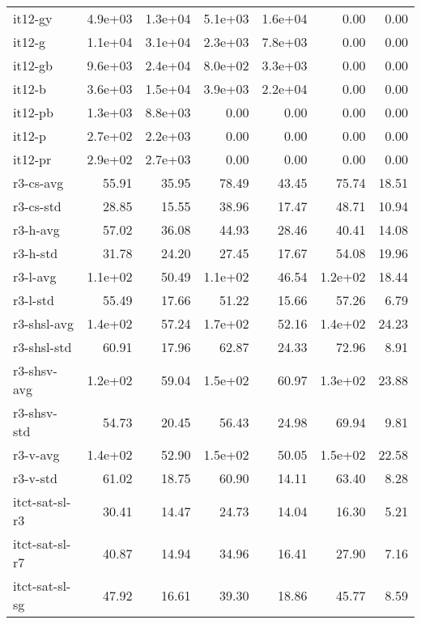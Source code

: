 \begin{tabular}{lrrrrrr}
it12-gy             & 4.9e+03 & 1.3e+04 & 5.1e+03 & 1.6e+04 &    0.00 &    0.00 \\
it12-g              & 1.1e+04 & 3.1e+04 & 2.3e+03 & 7.8e+03 &    0.00 &    0.00 \\
it12-gb             & 9.6e+03 & 2.4e+04 & 8.0e+02 & 3.3e+03 &    0.00 &    0.00 \\
it12-b              & 3.6e+03 & 1.5e+04 & 3.9e+03 & 2.2e+04 &    0.00 &    0.00 \\
it12-pb             & 1.3e+03 & 8.8e+03 &    0.00 &    0.00 &    0.00 &    0.00 \\
it12-p              & 2.7e+02 & 2.2e+03 &    0.00 &    0.00 &    0.00 &    0.00 \\
it12-pr             & 2.9e+02 & 2.7e+03 &    0.00 &    0.00 &    0.00 &    0.00 \\
r3-cs-avg           &   55.91 &   35.95 &   78.49 &   43.45 &   75.74 &   18.51 \\
r3-cs-std           &   28.85 &   15.55 &   38.96 &   17.47 &   48.71 &   10.94 \\
r3-h-avg            &   57.02 &   36.08 &   44.93 &   28.46 &   40.41 &   14.08 \\
r3-h-std            &   31.78 &   24.20 &   27.45 &   17.67 &   54.08 &   19.96 \\
r3-l-avg            & 1.1e+02 &   50.49 & 1.1e+02 &   46.54 & 1.2e+02 &   18.44 \\
r3-l-std            &   55.49 &   17.66 &   51.22 &   15.66 &   57.26 &    6.79 \\
r3-shsl-avg         & 1.4e+02 &   57.24 & 1.7e+02 &   52.16 & 1.4e+02 &   24.23 \\
r3-shsl-std         &   60.91 &   17.96 &   62.87 &   24.33 &   72.96 &    8.91 \\
r3-shsv-avg         & 1.2e+02 &   59.04 & 1.5e+02 &   60.97 & 1.3e+02 &   23.88 \\
r3-shsv-std         &   54.73 &   20.45 &   56.43 &   24.98 &   69.94 &    9.81 \\
r3-v-avg            & 1.4e+02 &   52.90 & 1.5e+02 &   50.05 & 1.5e+02 &   22.58 \\
r3-v-std            &   61.02 &   18.75 &   60.90 &   14.11 &   63.40 &    8.28 \\
itct-sat-sl-r3      &   30.41 &   14.47 &   24.73 &   14.04 &   16.30 &    5.21 \\
itct-sat-sl-r7      &   40.87 &   14.94 &   34.96 &   16.41 &   27.90 &    7.16 \\
itct-sat-sl-sg      &   47.92 &   16.61 &   39.30 &   18.86 &   45.77 &    8.59 \\

\end{tabular}
